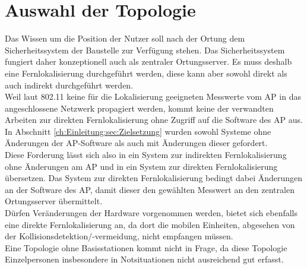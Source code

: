 \section{Auswahl der Topologie}
Das Wissen um die Position der Nutzer soll nach der Ortung dem Sicherheitssystem der Baustelle zur Verfügung stehen. 
Das Sicherheitssystem fungiert daher konzeptionell auch als zentraler Ortungsserver.
Es muss deshalb eine Fernlokalisierung durchgeführt werden, diese kann aber sowohl direkt als auch indirekt durchgeführt werden. \\
Weil laut 802.11 keine für die Lokalisierung geeigneten Messwerte vom AP in das angeschlossene Netzwerk propagiert werden, kommt keine der verwandten Arbeiten zur direkten Fernlokalisierung ohne Zugriff auf die Software des AP aus.
In Abschnitt \ref{ch:Einleitung:sec:Zielsetzung} wurden sowohl Systeme ohne Änderungen der AP-Software als auch mit Änderungen dieser gefordert. \\
Diese Forderung lässt sich also in ein System zur indirekten Fernlokalisierung ohne Änderungen am AP und in ein System zur direkten Fernlokalisierung übersetzen.
Das System zur direkten Fernlokalisierung bedingt dabei Änderungen an der Software des AP, damit dieser den gewählten Messwert an den zentralen Ortungsserver übermittelt.\\
Dürfen Veränderungen der Hardware vorgenommen werden, bietet sich ebenfalls eine direkte Fernlokalisierung an, da dort die mobilen Einheiten, abgesehen von der Kollisionsdetektion/-vermeidung, nicht empfangen müssen.\\
Eine Topologie ohne Basisstationen kommt nicht in Frage, da diese Topologie Einzelpersonen insbesondere in Notsituationen nicht ausreichend gut erfasst.

